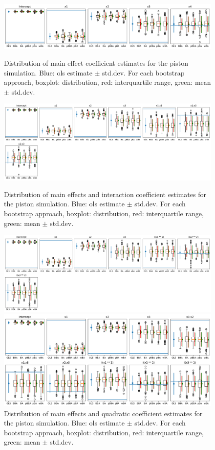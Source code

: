 \documentclass{article}
\begin{document}
\begin{figure}
    \includegraphics[width=\linewidth]{figures/piston-main-dist.pdf}
    \caption{Distribution of main effect coefficient estimates for the piston simulation. 
        Blue: ols estimate $\pm$ std.dev. 
        For each bootstrap approach, boxplot: distribution, red: interquartile range, green: mean $\pm$ std.dev.}
    \label{fig:piston-main-dist}
    \includegraphics[width=\linewidth]{figures/piston-int-dist.pdf}
    \caption{Distribution of main effects and interaction coefficient estimates for the piston simulation. 
        Blue: ols estimate $\pm$ std.dev. 
        For each bootstrap approach, boxplot: distribution, red: interquartile range, green: mean $\pm$ std.dev.}
    \label{fig:piston-int-dist}
    \includegraphics[width=\linewidth]{figures/piston-quadratic-dist.pdf}
    \caption{Distribution of main effects and quadratic coefficient estimates for the piston simulation. 
        Blue: ols estimate $\pm$ std.dev. 
        For each bootstrap approach, boxplot: distribution, red: interquartile range, green: mean $\pm$ std.dev.}
    \label{fig:piston-quadratic-dist}
    \includegraphics[width=\linewidth]{figures/piston-full-dist.pdf}

\end{figure}
\end{document}
